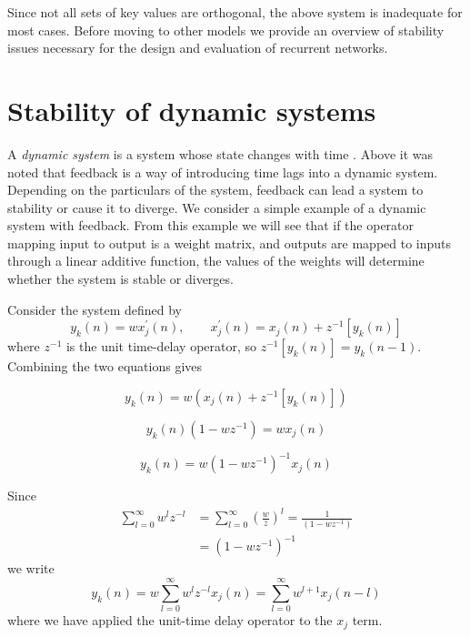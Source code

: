 Since not all sets of key values are orthogonal, the above system is inadequate for most cases. Before moving to other models we provide an overview of stability issues necessary for the design and evaluation of recurrent networks.

\section{Stability of dynamic systems}

A \emph{dynamic system} is a system whose state changes with time \cite[p. 675]{Haykin:2009:NNC:1213811}. Above it was noted that feedback is a way of introducing time lags into a dynamic system. Depending on the particulars of the system, feedback can lead a system to stability or cause it to diverge. We consider a simple example \cite[p. 18-21]{Haykin:2009:NNC:1213811} of a dynamic system with feedback. From this example we will see that if the operator mapping input to output is a weight matrix, and outputs are mapped to inputs through a linear additive function, the values of the weights will determine whether the system is stable or diverges.

Consider the system defined by
%
\begin{equation*}
y_k(n) = wx_j^\prime(n), \qquad x_j^\prime(n) = x_j(n) + z^{-1}[y_k(n)]
\end{equation*}
%
where $z^{-1}$ is the unit time-delay operator, so $z^{-1}[y_k(n)] = y_k(n-1)$. Combining the two equations gives

\begin{equation*}
  y_k(n) = w \left(x_j(n) + z^{-1}[y_k(n)]\right)
\end{equation*}

\begin{equation*}
  y_k(n)(1 - wz^{-1}) = wx_j(n)
\end{equation*}

\begin{equation*}
  y_k(n) = w(1 - wz^{-1})^{-1}x_j(n)
\end{equation*}

Since
%
\begin{align*}
  \sum_{l=0}^{\infty}w^l z^{-l} & = \sum_{l=0}^{\infty}\left(\frac{w}{z}\right)^l = \frac{1}{(1 - wz^{-1})} \\
  & = (1 - wz^{-1})^{-1}
\end{align*}
%
we write
%
\begin{equation*}
  y_k(n) = w \sum_{l=0}^{\infty}w^l z^{-l}x_j(n) = \sum_{l=0}^{\infty}w^{l+1}x_j(n - l)
\end{equation*}
%
where we have applied the unit-time delay operator to the $x_j$ term.

